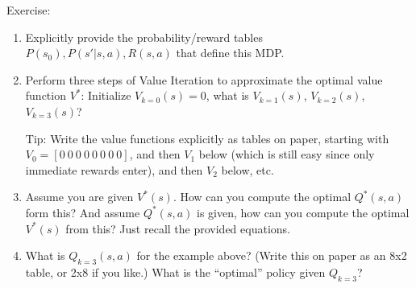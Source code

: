 Exercise:
\begin{enumerate}
\item Explicitly provide the probability/reward tables $P(s_0), P(s'|s,a), R(s,a)$ that define this MDP.

\item Perform three steps of Value Iteration to approximate the optimal value function $V^*$: Initialize $V_{k=0}(s)=0$, what is
  $V_{k=1}(s)$, $V_{k=2}(s)$, $V_{k=3}(s)$?

{\small Tip: Write the value functions explicitly as tables on paper, starting with $V_0 = [0 ~ 0 ~ 0 ~ 0 ~ 0 ~ 0 ~ 0 ~ 0]$, and then $V_1$ below (which is still easy since only immediate rewards enter), and then $V_2$ below, etc.

}
  

\item Assume you are given $V^*(s)$. How can you compute the optimal $Q^*(s,a)$
  form this? And assume $Q^*(s,a)$ is given, how can you compute the optimal
  $V^*(s)$ from this? Just recall the provided equations.

\item What is $Q_{k=3}(s,a)$ for the example above? (Write this on paper as an 8x2 table, or 2x8 if you like.) What is the
  ``optimal'' policy given $Q_{k=3}$?
\end{enumerate}

